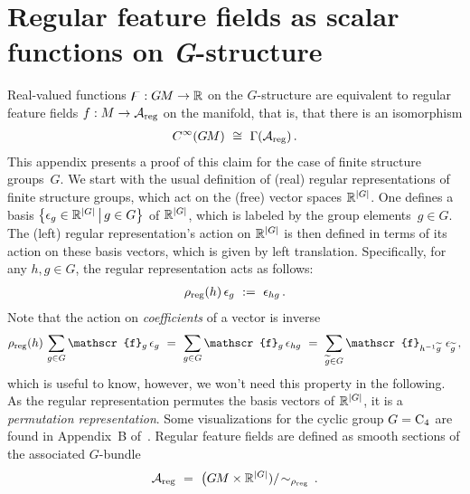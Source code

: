 

\filbreak


\section{Regular feature fields as scalar functions on \textit{G}-structure}
\label{apx:regular_field_scalar_GM}


Real-valued functions $\digamma: G\mkern-1.4muM \to \mathbb{R}$ on the $G$-structure are equivalent to regular feature fields $f: M \to \mathcal{A}_{\textup{reg}}$ on the manifold, that is, that there is an isomorphism
\begin{align}
    C^\infty(G\mkern-1.4muM)\ \cong\ \Gamma(\mathcal{A}_{\textup{reg}}) \,.
\end{align}
This appendix presents a proof of this claim for the case of finite structure groups~$G$.
We start with the usual definition of (real) regular representations of finite structure groups, which act on the (free) vector spaces $\mathbb{R}^{|G|}$.
One defines a basis $\big\{ \epsilon_g \in \mathbb{R}^{|G|} \,\big|\, g\in G \big\}$ of $\mathbb{R}^{|G|}$, which is labeled by the group elements~$g\in G$.
The (left) regular representation's action on $\mathbb{R}^{|G|}$ is then defined in terms of its action on these basis vectors, which is given by left translation.
Specifically, for any $h,g\in G$, the regular representation acts as follows:
\begin{align}\label{eq:finite_regular_rep_action}
    \rho_{\textup{reg}}(h)\, \epsilon_g\ :=\ \epsilon_{hg} \,.
\end{align}
Note that the action on \emph{coefficients} of a vector is inverse
\begin{align}\label{eq:finite_regular_rep_action}
    \rho_{\textup{reg}}(h)\, \sum_{g\in G} \mathscr{f}_g\, \epsilon_g
    \ =\ \sum_{g\in G} \mathscr{f}_g\, \epsilon_{hg}
    \ =\ \sum_{{\widetilde{g}}\in G} \mathscr{f}_{h^{-1}\widetilde{g}}\ \epsilon_{\widetilde{g}} \,,
\end{align}
which is useful to know, however, we won't need this property in the following.
As the regular representation permutes the basis vectors of $\mathbb{R}^{|G|}$, it is a \emph{permutation representation}.
Some visualizations for the cyclic group $G=\operatorname{C}_{4}$ are found in Appendix~B of~\cite{Weiler2019_E2CNN}.
Regular feature fields are defined as smooth sections of the associated $G$-bundle
\begin{align}
    \mathcal{A}_{\textup{reg}}\ =\ \big(G\mkern-1.4muM \times \mathbb{R}^{|G|}) /\! \sim_{\rho_\textup{reg}} \,.
\end{align}


